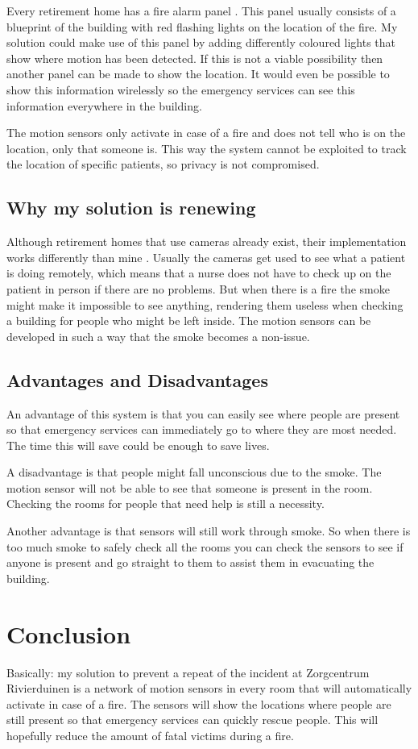 \documentclass[12pt]{report}
\begin{document}
Every retirement home has a fire alarm panel \cite{BinnenlandseZakenenKoninkrijksrelaties}. This panel usually consists of a blueprint of the building with red flashing lights on the location of the fire. My solution could make use of this panel by adding differently coloured lights that show where motion has been detected. If this is not a viable possibility then another panel can be made to show the location. It would even be possible to show this information wirelessly so the emergency services can see this information everywhere in the building.

The motion sensors only activate in case of a fire and does not tell who is on the location, only that someone is. This way the system cannot be exploited to track the location of specific patients, so privacy is not compromised.


\section{Why my solution is renewing}
Although retirement homes that use cameras already exist, their implementation works differently than mine \cite{Persoonsgegevens2016}. Usually the cameras get used to see what a patient is doing remotely, which means that a nurse does not have to check up on the patient in person if there are no problems. But when there is a fire the smoke might make it impossible to see anything, rendering them useless when checking a building for people who might be left inside. The motion sensors can be developed in such a way that the smoke becomes a non-issue.


\section{Advantages and Disadvantages}
An advantage of this system is that you can easily see where people are present so that emergency services can immediately go to where they are most needed. The time this will save could be enough to save lives.

A disadvantage is that people might fall unconscious due to the smoke. The motion sensor will not be able to see that someone is present in the room. Checking the rooms for people that need help is still a necessity.

Another advantage is that sensors will still work through smoke. So when there is too much smoke to safely check all the rooms you can check the sensors to see if anyone is present and go straight to them to assist them in evacuating the building.


\chapter{Conclusion}
Basically: my solution to prevent a repeat of the incident at Zorgcentrum Rivierduinen is a network of motion sensors in every room that will automatically activate in case of a fire. The sensors will show the locations where people are still present so that emergency services can quickly rescue people. This will hopefully reduce the amount of fatal victims during a fire.




\end{document}
